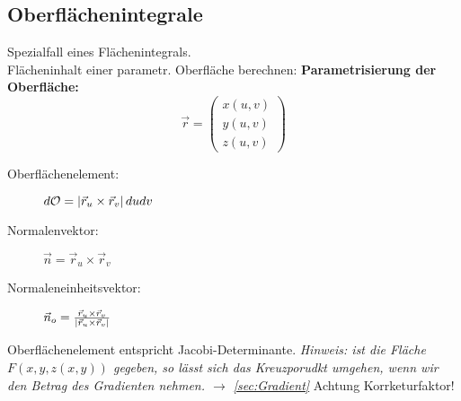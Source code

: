 \subsection{Oberflächenintegrale}
    Spezialfall eines Flächenintegrals.\\    
    Flächeninhalt einer parametr. Oberfläche berechnen:
    \textbf{Parametrisierung der Oberfläche:}
    $$
        \vec{r} = \begin{pmatrix}
            x(u,v)\\
            y(u,v)\\
            z(u,v)
        \end{pmatrix}
    $$
    \begin{description}
        \item[Oberflächenelement:] $d\mathcal{O} = \abs*{\vec{r}_u \times \vec{r}_v} du dv$
        \item[Normalenvektor:]  $\vec{n} = \vec{r}_u \times \vec{r}_v$
        \item[Normaleneinheitsvektor:]  $\vec{n}_o = \frac{\vec{r}_u \times \vec{r}_v}{\abs*{\vec{r}_u \times \vec{r}_v}}$
    \end{description}
    {\small Oberflächenelement entspricht Jacobi-Determinante.} \vskip2mm
    \textit{Hinweis: ist die Fläche $F(x,y,z(x,y))$ gegeben, so lässt sich das Kreuzporudkt umgehen, wenn wir
    den Betrag des Gradienten nehmen. $\to$ \ref{sec:Gradient}} Achtung Korrketurfaktor! 